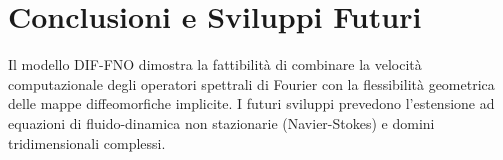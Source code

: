 \documentclass[11pt,a4paper]{article}
\begin{document}
\section{Conclusioni e Sviluppi Futuri}
Il modello DIF-FNO dimostra la fattibilità di combinare la velocità computazionale degli operatori spettrali di Fourier con la flessibilità geometrica delle mappe diffeomorfiche implicite. I futuri sviluppi prevedono l'estensione ad equazioni di fluido-dinamica non stazionarie (Navier-Stokes) e domini tridimensionali complessi.
\end{document}
